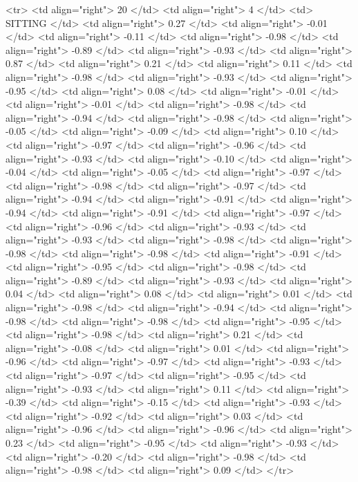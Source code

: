   <tr> <td align="right"> 20 </td> <td align="right">   4 </td> <td> SITTING </td> <td align="right"> 0.27 </td> <td align="right"> -0.01 </td> <td align="right"> -0.11 </td> <td align="right"> -0.98 </td> <td align="right"> -0.89 </td> <td align="right"> -0.93 </td> <td align="right"> 0.87 </td> <td align="right"> 0.21 </td> <td align="right"> 0.11 </td> <td align="right"> -0.98 </td> <td align="right"> -0.93 </td> <td align="right"> -0.95 </td> <td align="right"> 0.08 </td> <td align="right"> -0.01 </td> <td align="right"> -0.01 </td> <td align="right"> -0.98 </td> <td align="right"> -0.94 </td> <td align="right"> -0.98 </td> <td align="right"> -0.05 </td> <td align="right"> -0.09 </td> <td align="right"> 0.10 </td> <td align="right"> -0.97 </td> <td align="right"> -0.96 </td> <td align="right"> -0.93 </td> <td align="right"> -0.10 </td> <td align="right"> -0.04 </td> <td align="right"> -0.05 </td> <td align="right"> -0.97 </td> <td align="right"> -0.98 </td> <td align="right"> -0.97 </td> <td align="right"> -0.94 </td> <td align="right"> -0.91 </td> <td align="right"> -0.94 </td> <td align="right"> -0.91 </td> <td align="right"> -0.97 </td> <td align="right"> -0.96 </td> <td align="right"> -0.93 </td> <td align="right"> -0.93 </td> <td align="right"> -0.98 </td> <td align="right"> -0.98 </td> <td align="right"> -0.98 </td> <td align="right"> -0.91 </td> <td align="right"> -0.95 </td> <td align="right"> -0.98 </td> <td align="right"> -0.89 </td> <td align="right"> -0.93 </td> <td align="right"> 0.04 </td> <td align="right"> 0.08 </td> <td align="right"> 0.01 </td> <td align="right"> -0.98 </td> <td align="right"> -0.94 </td> <td align="right"> -0.98 </td> <td align="right"> -0.98 </td> <td align="right"> -0.95 </td> <td align="right"> -0.98 </td> <td align="right"> 0.21 </td> <td align="right"> -0.08 </td> <td align="right"> 0.01 </td> <td align="right"> -0.96 </td> <td align="right"> -0.97 </td> <td align="right"> -0.93 </td> <td align="right"> -0.97 </td> <td align="right"> -0.95 </td> <td align="right"> -0.93 </td> <td align="right"> 0.11 </td> <td align="right"> -0.39 </td> <td align="right"> -0.15 </td> <td align="right"> -0.93 </td> <td align="right"> -0.92 </td> <td align="right"> 0.03 </td> <td align="right"> -0.96 </td> <td align="right"> -0.96 </td> <td align="right"> 0.23 </td> <td align="right"> -0.95 </td> <td align="right"> -0.93 </td> <td align="right"> -0.20 </td> <td align="right"> -0.98 </td> <td align="right"> -0.98 </td> <td align="right"> 0.09 </td> </tr>
